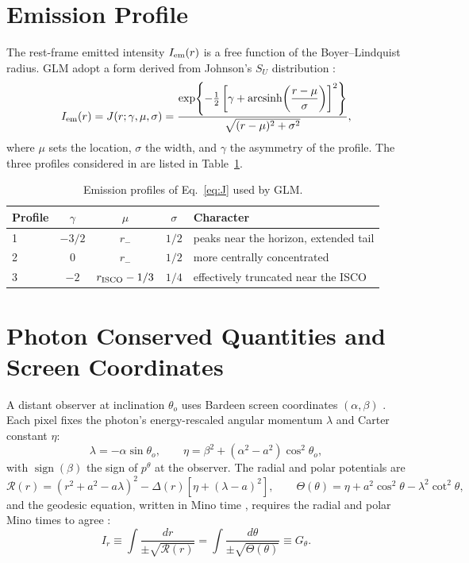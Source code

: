 \documentclass[11pt]{article}
\begin{document}
\section{Emission Profile}

The rest-frame emitted intensity $I_{\rm em}(r)$ is a free function of the
Boyer--Lindquist radius. GLM adopt a form derived from Johnson's $S_U$
distribution \cite{Johnson1949}:
\begin{equation}
I_{\rm em}(r) = J(r;\gamma,\mu,\sigma)
= \frac{\exp\!\left\{-\tfrac12\left[\gamma + \operatorname{arcsinh}\!\left(\dfrac{r-\mu}{\sigma}\right)\right]^2\right\}}{\sqrt{(r-\mu)^2 + \sigma^2}},
\label{eq:J}
\end{equation}
where $\mu$ sets the location, $\sigma$ the width, and $\gamma$ the asymmetry of
the profile. The three profiles considered in \cite{GLM2020} are listed in
Table~\ref{tab:profiles}.

\begin{table}[h]
\centering
\begin{tabular}{lcccl}
\toprule
Profile & $\gamma$ & $\mu$ & $\sigma$ & Character \\
\midrule
1 & $-3/2$ & $r_-$ & $1/2$ & peaks near the horizon, extended tail \\
2 & $0$    & $r_-$ & $1/2$ & more centrally concentrated \\
3 & $-2$   & $r_{\rm ISCO} - 1/3$ & $1/4$ & effectively truncated near the ISCO \\
\bottomrule
\end{tabular}
\caption{Emission profiles of Eq.~\eqref{eq:J} used by GLM.}
\label{tab:profiles}
\end{table}

\section{Photon Conserved Quantities and Screen Coordinates}

A distant observer at inclination $\theta_o$ uses Bardeen screen coordinates
$(\alpha,\beta)$ \cite{Bardeen1973}. Each pixel fixes the photon's energy-rescaled
angular momentum $\lambda$ and Carter constant $\eta$:
\begin{equation}
\lambda = -\alpha\sin\theta_o, \qquad
\eta = \beta^2 + \left(\alpha^2 - a^2\right)\cos^2\theta_o,
\end{equation}
with $\operatorname{sign}(\beta)$ the sign of $p^\theta$ at the observer.
The radial and polar potentials are
\begin{equation}
\mathcal{R}(r) = \left(r^2 + a^2 - a\lambda\right)^2 - \Delta(r)\left[\eta + (\lambda - a)^2\right],
\qquad
\Theta(\theta) = \eta + a^2\cos^2\theta - \lambda^2\cot^2\theta,
\end{equation}
and the geodesic equation, written in Mino time \cite{Mino2003}, requires the
radial and polar Mino times to agree \cite{GL2020lensing}:
\begin{equation}
I_r \equiv \int \frac{dr}{\pm\sqrt{\mathcal{R}(r)}}
= \int \frac{d\theta}{\pm\sqrt{\Theta(\theta)}} \equiv G_\theta.
\end{equation}
\end{document}

